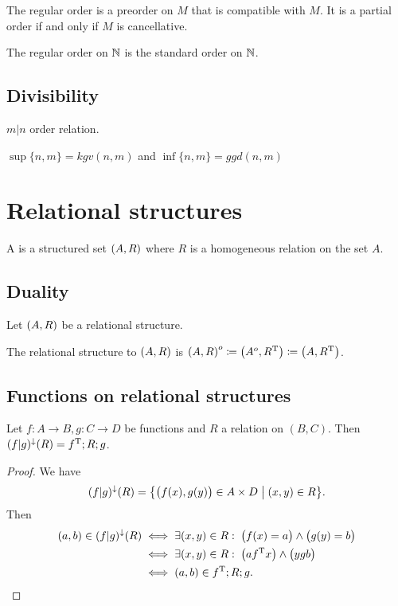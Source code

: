\begin{lemma}
The regular order is a preorder on $M$ that is compatible with $M$. It is a partial order \textup{if and only if} $M$ is cancellative.
\end{lemma}

\begin{example}
The regular order on $\mathbb{N}$ is the standard order on $\mathbb{N}$.
\end{example}

\section{Divisibility}
$m|n$ order relation.

$\sup\{n,m\} = kgv(n,m)$ and $\inf\{n,m\} = ggd(n,m)$



\chapter{Relational structures}
\begin{definition}
A  is a structured set $\sSet{A, R}$ where $R$ is a homogeneous relation on the set $A$.
\end{definition}


\section{Duality}
\begin{definition}
Let $\sSet{A,R}$ be a relational structure.

The relational structure  to $\sSet{A,R}$ is $\sSet{A, R}^o \defeq \sSet{A^o,R^\transp}\defeq \sSet{A,R^\transp}$.
\end{definition}



\section{Functions on relational structures}

\begin{lemma} \label{parallelFunctionOnRelationGraph}
Let $f: A\to B, g: C\to D$ be functions and $R$ a relation on $(B, C)$. Then $(f|g)^\downarrow(R) = f^{\mathrm{T}};R;g$.
\end{lemma}
\begin{proof}
We have
\[ (f|g)^\imf(R) = \setbuilder{\big(f(x),g(y)\big)\in A\times D}{(x,y)\in R}. \]
Then
\begin{align*}
(a,b) \in (f|g)^\downarrow(R) &\iff \exists (x,y)\in R: \; \big(f(x) = a\big)\land \big(g(y) = b\big) \\
&\iff \exists (x,y)\in R: \; \big(af^{\mathrm{T}} x\big) \land \big(ygb\big) \\
&\iff (a,b) \in f^{\mathrm{T}};R;g.
\end{align*}
\end{proof}

